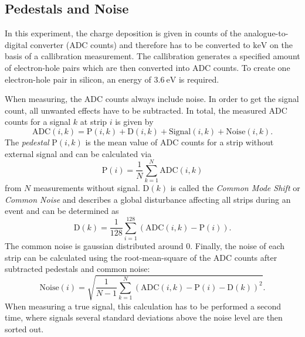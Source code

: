 \subsection{Pedestals and Noise}
\label{ch:ped}
In this experiment, the charge deposition is given in counts of the analogue-to-digital converter (ADC counts) and therefore has to be converted to $\unit{\kilo\eV}$ 
on the basis of a callibration measurement. The callibration generates a specified amount of electron-hole pairs which are then converted into ADC counts.
To create one electron-hole pair in silicon, an energy of $\qty{3.6}{\eV}$ \cite{SiliconStrip} is required.

When measuring, the ADC counts always include noise. In order to get the signal count, all unwanted effects have to be subtracted.
In total, the measured ADC counts for a signal $k$ at strip $i$ is given by 
\begin{equation}
    \text{ADC}(i, k) = \text{P}(i, k) + \text{D}(i,k) + \text{Signal}(i, k) + \text{Noise}(i, k).
    \label{eq:ADC}
\end{equation}    
The \textit{pedestal} $\text{P}(i, k)$ is the mean value of ADC counts for a strip without external signal and can be calculated via 
\begin{equation}
    \text{P}(i) = \frac{1}{N} \sum^N_{k = 1} \text{ADC}(i,k)
    \label{eq:pedestals}
\end{equation}
from $N$ measurements without signal. $\text{D}(k)$ is called the \textit{Common Mode Shift} or \textit{Common Noise} and describes a global disturbance affecting all 
strips during an event and can be determined as 
\begin{equation}
    \text{D}(k) = \frac{1}{128} \sum^{128}_{i = 1} (\text{ADC}(i,k) -\text{P}(i)).
    \label{eq:common_noise}
\end{equation}
The common noise is gaussian distributed around 0.
Finally, the noise of each strip can be calculated using the root-mean-square of the ADC counts after subtracted pedestals and common noise:
\begin{equation}
    \text{Noise}(i) = \sqrt{\frac{1}{N-1} \sum^{N}_{k = 1} (\text{ADC}(i,k) -\text{P}(i) - \text{D}(k))^2}.
    \label{eq:noise}
\end{equation}
When measuring a true signal, this calculation has to be performed a second time, where signals several standard deviations above the noise level are then sorted out.

